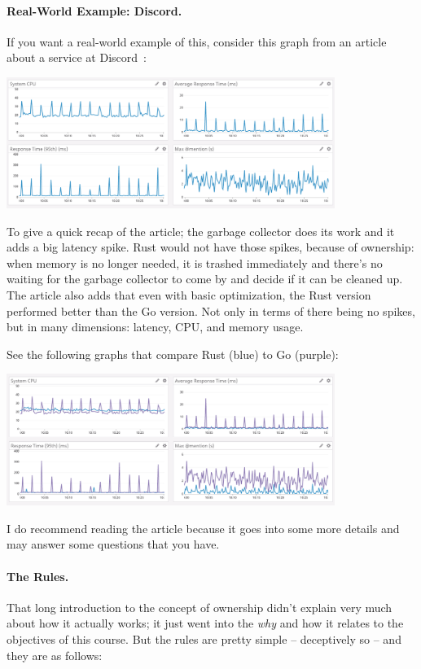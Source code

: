 \paragraph{Real-World Example: Discord.} If you want a real-world example of this, consider this graph from an article about a service at Discord~\cite{discord}:

\begin{center}
\includegraphics[width=0.8\textwidth]{images/golang-gc.png}
\end{center}

To give a quick recap of the article; the garbage collector does its work and it adds a big latency spike. Rust would not have those spikes, because of ownership: when memory is no longer needed, it is trashed immediately and there's no waiting for the garbage collector to come by and decide if it can be cleaned up. The article also adds that even with basic optimization, the Rust version performed better than the Go version. Not only in terms of there being no spikes, but in many dimensions: latency, CPU, and memory usage.

See the following graphs that compare Rust (blue) to Go (purple): 
\begin{center}
\includegraphics[width=0.8\textwidth]{images/rust-vs-go.png}
\end{center}

I do recommend reading the article because it goes into some more details and may answer some questions that you have. 

\paragraph{The Rules.}
That long introduction to the concept of ownership didn't explain very much about how it actually works; it just went into the \textit{why} and how it relates to the objectives of this course. But the rules are pretty simple -- deceptively so -- and they are as follows:

